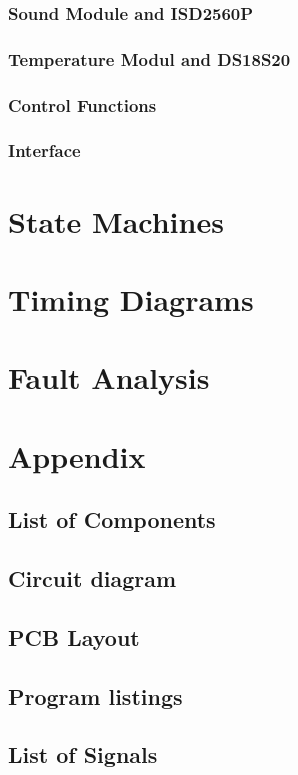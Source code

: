\documentclass[a4paper,11pt]{article}
\begin{document}
		\subsubsection{Sound Module and ISD2560P}

		\subsubsection{Temperature Modul and DS18S20}

		\subsubsection{Control Functions}

		\subsubsection{Interface}

\section{State Machines}

\section{Timing Diagrams}

\section{Fault Analysis}

\section{Appendix}

	\subsection{List of Components}

	\subsection{Circuit diagram}

	\subsection{PCB Layout}

	\subsection{Program listings}

	\subsection{List of Signals}
\end{document}
